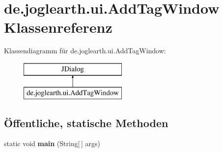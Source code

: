 \section{de.\-joglearth.\-ui.\-Add\-Tag\-Window Klassenreferenz}
\label{classde_1_1joglearth_1_1ui_1_1_add_tag_window}
Klassendiagramm für de.\-joglearth.\-ui.\-Add\-Tag\-Window\-:\begin{figure}[H]
\begin{center}
\leavevmode
\includegraphics[height=2.000000cm]{classde_1_1joglearth_1_1ui_1_1_add_tag_window}
\end{center}
\end{figure}
\subsection*{Öffentliche, statische Methoden}
\begin{DoxyCompactItemize}
\item 
static void {\bfseries main} (String[$\,$] args)\label{classde_1_1joglearth_1_1ui_1_1_add_tag_window_a929cd10694aad34a176360d5ed452e37}

\end{DoxyCompactItemize}
